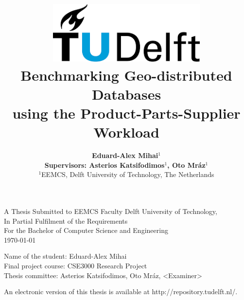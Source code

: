 \title{
    \includegraphics[width=8cm, keepaspectratio]{tudelftlogo.png}\\
    \vspace*{2cm}
    \textbf{
         Benchmarking Geo-distributed Databases \\
         using the Product-Parts-Supplier Workload
    }\\
    \vspace*{1cm}
}

\author{
    \textbf{Eduard-Alex Mihai$^1$}\\
    \hfill \break
    \textbf{Supervisors: Asterios Katsifodimos$^1$, Oto Mráz$^1$}\\
    \break
    {\large 
        \hfill \break
        $^1$EEMCS, Delft University of Technology, The Netherlands
    }\\
}

\date{}

\maketitle
\thispagestyle{empty}

\let\clearpagebackup\clearpage
\renewcommand{\clearpage}{ }

\onecolumn

\vspace*{1.5cm}
\begin{center}
    A Thesis Submitted to EEMCS Faculty Delft University of Technology,\\
    In Partial Fulfilment of the Requirements\\
    For the Bachelor of Computer Science and Engineering\\
    \today
\end{center}

\vspace*{2cm}

\noindent
{\small
Name of the student: Eduard-Alex Mihai \\
Final project course: CSE3000 Research Project\\
Thesis committee: Asterios Katsifodimos, Oto Mráz, \textless Examiner\textgreater\\
}
\vfill

\begin{center}
    An electronic version of this thesis is available at http://repository.tudelft.nl/.
\end{center}

\twocolumn
\let\clearpage\clearpagebackup  
\clearpage
\setcounter{page}{1}
